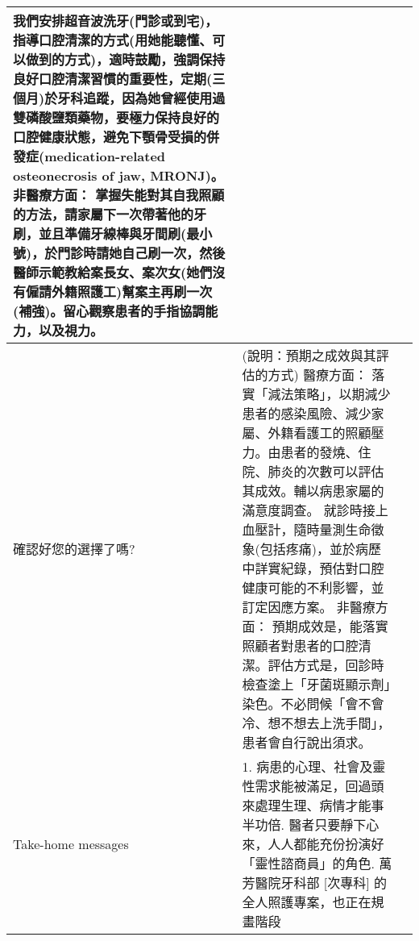 \documentclass[12pt, a4paper]{article}
\begin{document}
\begin{xltabular}{1.0\linewidth}[c]{|p{2.3cm}|p{12.4cm}|l|}
   我們安排超音波洗牙(門診或到宅)，指導口腔清潔的方式(用她能聽懂、可以做到的方式)，適時鼓勵，強調保持良好口腔清潔習慣的重要性，定期(三個月)於牙科追蹤，因為她曾經使用過雙磷酸鹽類藥物，要極力保持良好的口腔健康狀態，避免下顎骨受損的併發症(medication-related osteonecrosis of jaw, MRONJ)。\newline 
   非醫療方面： 掌握失能對其自我照顧的方法，請家屬下一次帶著他的牙刷，並且準備牙線棒與牙間刷(最小號)，於門診時請她自己刷一次，然後醫師示範教給案長女、案次女(她們沒有僱請外籍照護工)幫案主再刷一次(補強)。留心觀察患者的手指協調能力，以及視力。 &
   \\ \hline
確認好您的選擇了嗎? &
  {\color[HTML]{C0C0C0}(說明：預期之成效與其評估的方式)}\newline 
   醫療方面： 落實「減法策略」，以期減少患者的感染風險、減少家屬、外籍看護工的照顧壓力。由患者的發燒、住院、肺炎的次數可以評估其成效。輔以病患家屬的滿意度調查。 就診時接上血壓計，隨時量測生命徵象(包括疼痛)，並於病歷中詳實紀錄，預估對口腔健康可能的不利影響，並訂定因應方案。\newline 
   非醫療方面： 預期成效是，能落實照顧者對患者的口腔清潔。評估方式是，回診時檢查塗上「牙菌斑顯示劑」染色。不必問候「會不會冷、想不想去上洗手間」，患者會自行說出須求。 &
   \\ \hline
Take-home messages &
    1. 病患的心理、社會及靈性需求能被滿足，回過頭來處理生理、病情才能事半功倍. 醫者只要靜下心來，人人都能充份扮演好「靈性諮商員」的角色. 萬芳醫院牙科部 [次專科]  的全人照護專案，也正在規畫階段 \newline
    &
   \\ \hline
\end{xltabular}

\end{document}

